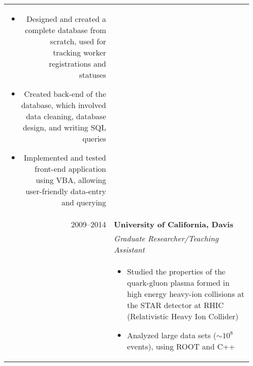 \documentclass[letterpaper,10pt]{article}
\begin{document}
\begin{tabular}{rp{13cm}}
\begin{itemize}
			\item Designed and created a complete database from scratch, used for tracking worker registrations and statuses
			\item Created back-end of the database, which involved data cleaning, database design, and writing SQL queries
			\item Implemented and tested front-end application using VBA, allowing user-friendly data-entry and querying
			\end{itemize} \\
	2009--2014 & \textbf{University of California, Davis} \\
		& \emph{Graduate Researcher/Teaching Assistant}\\
		&
			\begin{itemize}
			\item Studied the properties of the quark-gluon plasma formed in high energy heavy-ion collisions at the STAR detector at RHIC (Relativistic Heavy Ion Collider)
			\item Analyzed large data sets ($\sim10^8$ events), using ROOT and C++
			\end{itemize} 
\end{tabular}
\end{document}

